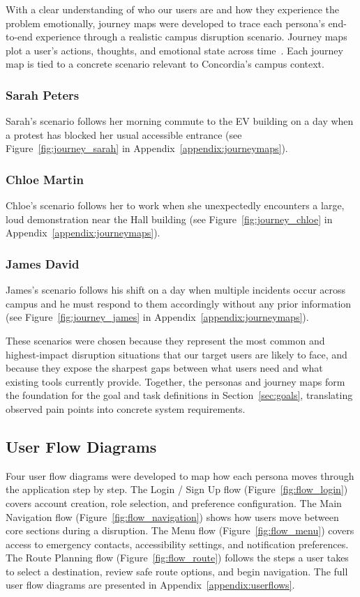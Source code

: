 \documentclass[sigconf]{acmart}
\begin{document}
With a clear understanding of who our users are and how they experience the problem emotionally, journey maps were developed to trace each persona's end-to-end experience through a realistic campus disruption scenario. Journey maps plot a user's actions, thoughts, and emotional state across time~\cite{kalbach2016mapping}. Each journey map is tied to a concrete scenario relevant to Concordia's campus context.
 
\subsubsection*{Sarah Peters}
Sarah's scenario follows her morning commute to the EV building on a day when a protest has blocked her usual accessible entrance (see Figure~\ref{fig:journey_sarah} in Appendix~\ref{appendix:journeymaps}).
 
\subsubsection*{Chloe Martin}
Chloe's scenario follows her to work when she unexpectedly encounters a large, loud demonstration near the Hall building (see Figure~\ref{fig:journey_chloe} in Appendix~\ref{appendix:journeymaps}).
 
\subsubsection*{James David}
James's scenario follows his shift on a day when multiple incidents occur across campus and he must respond to them accordingly without any prior information (see Figure~\ref{fig:journey_james} in Appendix~\ref{appendix:journeymaps}).
 
These scenarios were chosen because they represent the most common and highest-impact disruption situations that our target users are likely to face, and because they expose the sharpest gaps between what users need and what existing tools currently provide. Together, the personas and journey maps form the foundation for the goal and task definitions in Section~\ref{sec:goals}, translating observed pain points into concrete system requirements.
 
\subsection{User Flow Diagrams}
\label{sec:prototyping}
 
Four user flow diagrams were developed to map how each persona moves through the application step by step. The Login / Sign Up flow (Figure~\ref{fig:flow_login}) covers account creation, role selection, and preference configuration. The Main Navigation flow (Figure~\ref{fig:flow_navigation}) shows how users move between core sections during a disruption. The Menu flow (Figure~\ref{fig:flow_menu}) covers access to emergency contacts, accessibility settings, and notification preferences. The Route Planning flow (Figure~\ref{fig:flow_route}) follows the steps a user takes to select a destination, review safe route options, and begin navigation. The full user flow diagrams are presented in Appendix~\ref{appendix:userflows}.
 
\end{document}
